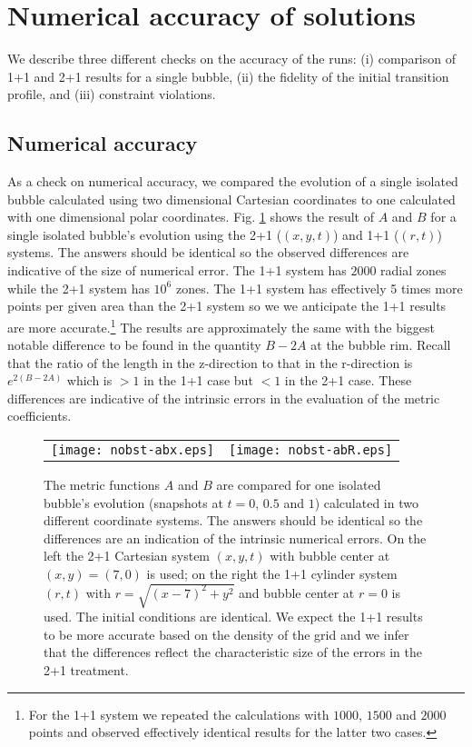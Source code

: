 \documentclass[preprintnumbers,eqsecnum,aps,prd,epsf,showpacs,nofootinbib
]{revtex4}
\begin{document}
\newpage

\section{Numerical accuracy of solutions}

We describe three different checks on the accuracy of the
runs: (i) comparison of 1+1 and 2+1 results for a single
bubble, (ii) the fidelity of the initial transition profile,
and (iii) constraint violations.

\subsection{Numerical accuracy}

As a check on numerical accuracy, we compared the evolution of a
single isolated bubble calculated using two dimensional Cartesian
coordinates to one calculated with one dimensional polar coordinates.
Fig. \ref{fig-nonbstab} shows the result of $A$ and $B$ for a single
isolated bubble's evolution using the 2+1 ($(x,y,t)$) and 1+1
($(r,t)$) systems. The answers should be identical so the observed
differences are indicative of the size of numerical error. The 1+1
system has $2000$ radial zones while the 2+1 system has $10^6$
zones. The 1+1 system has effectively 5 times more points per given
area than the 2+1 system so we we anticipate the 1+1 results are more
accurate.\footnote{For the 1+1 system we repeated the calculations
  with $1000$, $1500$ and $2000$ points and observed effectively
  identical results for the latter two cases.}  The results are
approximately the same with the biggest notable difference to be found
in the quantity $B-2A$ at the bubble rim. Recall that the ratio of the
length in the z-direction to that in the r-direction is $e^{2(B-2A)}$
which is $>1$ in the 1+1 case but $<1$ in the 2+1 case. These
differences are indicative of the intrinsic errors in the evaluation
of the metric coefficients.
\begin{figure}[htbp]
\begin{center}
\begin{tabular}{ll}
\texttt{[image: nobst-abx.eps]} &
\hspace{1cm}
\texttt{[image: nobst-abR.eps]}
\end{tabular}
\end{center}
\caption{The metric functions $A$ and $B$ are compared for one
  isolated bubble's evolution (snapshots at $t=0$, $0.5$ and $1$)
  calculated in two different coordinate systems.  The answers should
  be identical so the differences are an indication of the intrinsic
  numerical errors.  On the left the 2+1 Cartesian system $(x,y,t)$
  with bubble center at $(x,y)=(7,0)$ is used; on the right the 1+1
  cylinder system $(r,t)$ with $r=\sqrt{(x-7)^2+y^2}$ and bubble
  center at $r=0$ is used. The initial conditions are identical. We
  expect the 1+1 results to be more accurate based on the density of
  the grid and we infer that the differences reflect the
  characteristic size of the errors in the 2+1 treatment.}
\label{fig-nonbstab}
\end{figure}
\end{document}
